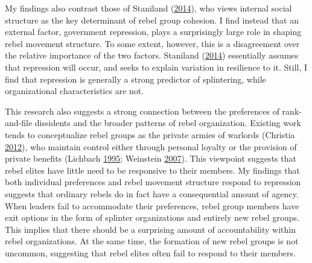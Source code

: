 \documentclass[12pt,]{book}
\theoremstyle{definition}
\theoremstyle{definition}
\theoremstyle{remark}
\begin{document}
My findings also contrast those of Staniland
(\protect\hyperlink{ref-Staniland2014}{2014}), who views internal social
structure as the key determinant of rebel group cohesion. I find instead
that an external factor, government repression, plays a surprisingly
large role in shaping rebel movement structure. To some extent, however,
this is a disagreement over the relative importance of the two factors.
Staniland (\protect\hyperlink{ref-Staniland2014}{2014}) essentially
assumes that repression will occur, and seeks to explain variation in
resilience to it. Still, I find that repression is generally a strong
predictor of splintering, while organizational characteristics are not.

This research also suggests a strong connection between the preferences
of rank-and-file dissidents and the broader patterns of rebel
organization. Existing work tends to conceptualize rebel groups as the
private armies of warlords (Christia
\protect\hyperlink{ref-Christia2012}{2012}), who maintain control either
through personal loyalty or the provision of private benefits (Lichbach
\protect\hyperlink{ref-Lichbach1995}{1995}; Weinstein
\protect\hyperlink{ref-Weinstein2007}{2007}). This viewpoint suggests
that rebel elites have little need to be responsive to their members. My
findings that both individual preferences and rebel movement structure
respond to repression suggests that ordinary rebels do in fact have a
consequential amount of agency. When leaders fail to accommodate their
preferences, rebel group members have exit options in the form of
splinter organizations and entirely new rebel groups. This implies that
there should be a surprising amount of accountability within rebel
organizations. At the same time, the formation of new rebel groups is
not uncommon, suggesting that rebel elites often fail to respond to
their members.
\end{document}

